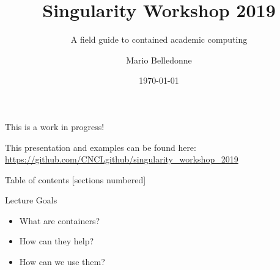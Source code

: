 \documentclass[10pt]{beamer}              %
\title{Singularity Workshop 2019}
\subtitle{A field guide to contained academic computing}
\date{\today}
\author{Mario Belledonne}
\institute{Yale Psychology}
\begin{document}
\maketitle
\begin{frame}{}
    This is a work in progress!
    
    This presentation and examples can be found here:\\
    \url{https://github.com/CNCLgithub/singularity_workshop_2019}
\end{frame}

\begin{frame}{Table of contents}
  [sections numbered]
  \tableofcontents[hideallsubsections]
\end{frame}

\begin{frame}{Lecture Goals}
\begin{itemize}
    \item What are containers?
    \item How can they help?
    \item How can we use them?
\end{itemize}
\end{frame}
    
\end{document}
